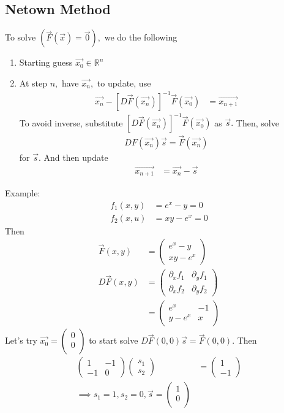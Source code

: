 \documentclass[11pt,oneside]{book}
\theoremstyle{break}
\theoremstyle{break}
\newcommand{\R}{\mathbb{R}}
\newcommand{\example}{\color{purple}Example: \color{black}}
\begin{document}
 \subsection[Netwon Method]{Netown Method}
To solve $(\vec{F}(\vec{x})=\vec{0}),$ we do the following \begin{enumerate}
\item Starting guess $\vec{x_0}\in \R^n$
\item At step $n,$ have $\vec{x_n},$ to update, use \begin{align*}
\vec{x_n}-[D\vec{F}(\vec{x_n})]^{-1}\vec{F}(\vec{x_0})&=\vec{x_{n+1}}
\end{align*}
To avoid inverse, substitute $[D\vec{F}(\vec{x_n})]^{-1}\vec{F}(\vec{x_0})$ as $\vec{s}.$ Then, solve \begin{align*}
DF(\vec{x_n})\vec{s}=\vec{F}(\vec{x_n})
\end{align*}
for $\vec{s}$. And then update \begin{align*}
\vec{x_{n+1}}&=\vec{x_n}-\vec{s}
\end{align*}
\end{enumerate}
\example \begin{align*}
f_1(x,y)&=e^x-y=0\\
f_2(x,u)&=xy-e^x=0
\end{align*}
Then \begin{align*}
\vec{F}(x,y)&=\begin{pmatrix}
e^x-y\\
xy-e^x
\end{pmatrix}\\
D\vec{F}(x,y)&=\begin{pmatrix}
\partial_xf_1&\partial_yf_1\\
\partial_xf_2&\partial_yf_2
\end{pmatrix}\\
&=\begin{pmatrix}
e^x &-1\\
y-e^x&x
\end{pmatrix}
\end{align*}
Let's try $\vec{x_0}=\begin{pmatrix}
0\\
0\\
\end{pmatrix} $ to start solve $D\vec{F}(0,0)\vec{s}=\vec{F}(0,0) $. Then \begin{align*}
\begin{pmatrix}
1&-1\\
-1&0
\end{pmatrix}\begin{pmatrix}
s_1\\
s_2
\end{pmatrix}&=\begin{pmatrix}
1\\
-1
\end{pmatrix}\\
\implies s_1=1, s_2=0, \vec{s}=\begin{pmatrix}
1\\
0\\
\end{pmatrix}
\end{align*}
\end{document}
